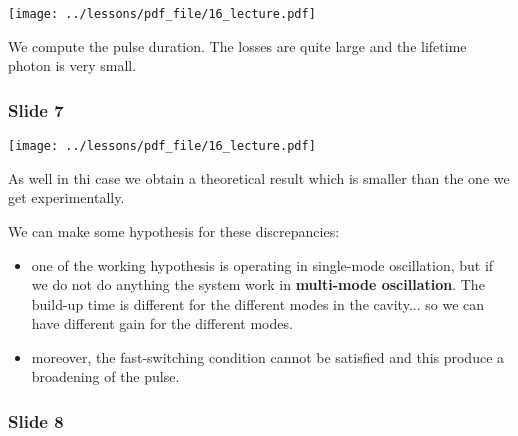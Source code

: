 \documentclass[../main/main.tex]{subfiles}
\begin{document}
\begin{minipage}[]{0.5\linewidth}
\centering
\texttt{[image: ../lessons/pdf\_file/16\_lecture.pdf]}
\end{minipage}
\hspace{0.3cm}\vspace{0.3cm}
\begin{minipage}[c]{0.47\linewidth}

We compute the pulse duration.
The losses are quite large and the lifetime photon is very small.

\end{minipage}

\newpage

\subsubsection*{Slide 7}

\begin{minipage}[]{0.5\linewidth}
\centering
\texttt{[image: ../lessons/pdf\_file/16\_lecture.pdf]}
\end{minipage}
\hspace{0.3cm}\vspace{0.3cm}
\begin{minipage}[c]{0.47\linewidth}

As well in thi case we obtain a theoretical result which is smaller than the one we get experimentally.

We can make some hypothesis for these discrepancies:
\begin{itemize}
\item one of the working hypothesis is operating in single-mode oscillation, but if we do not do anything the system work in \textbf{multi-mode oscillation}. The build-up time is different for the different modes in the cavity... so we can have different gain for the different modes.

\item moreover, the fast-switching condition cannot be satisfied and this produce a broadening of the pulse.

\end{itemize}

\end{minipage}

\subsubsection*{Slide 8}
\end{document}
